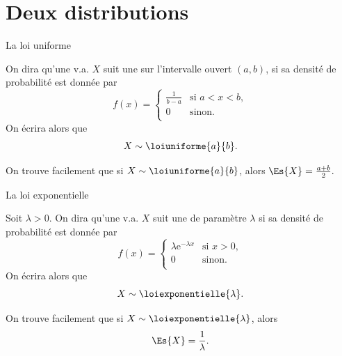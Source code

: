 \documentclass[nuit,charter,pied]{BeamerJS}
\begin{document}
\section{Deux distributions}
\begin{frame}{La loi uniforme}
	\begin{defn}{}
		On dira qu'une v.a. $X$ suit une  sur l'intervalle ouvert $(a,b)$, si sa densité de probabilité est donnée par
		\[f(x)=\begin{cases}
			\frac{1}{b-a}&\text{si~}a<x<b,\\
			0 &\text{sinon.}\\
		\end{cases}\]
		On écrira alors que
		\[X\sim\loiuniforme{a}{b}.\]
	\end{defn}
	On trouve facilement que si $X\sim\loiuniforme{a}{b}$, alors $\Es{X}=\frac{a+b}{2}.$
\end{frame}

\begin{frame}{La loi exponentielle}
	\begin{defn}{}
		Soit $\lambda>0$. On dira qu'une v.a. $X$ suit une  de paramètre $\lambda$ si sa densité de probabilité est donnée par
		\[f(x)=\begin{cases}
			\lambda\text{e}^{-\lambda x}&\text{si~}x>0,\\
			0 &\text{sinon.}\\
		\end{cases}\]
		On écrira alors que
		\[X\sim\loiexponentielle{\lambda}.\]
	\end{defn}
	On trouve facilement que si $X\sim\loiexponentielle{\lambda}$, alors
	\[\Es{X}=\frac{1}{\lambda}.\]
\end{frame}
\end{document}
